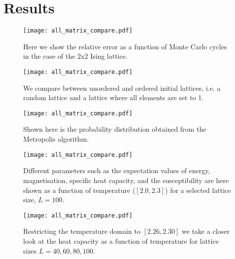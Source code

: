 \section{Results}
\label{sec:results}

\begin{figure}[htbp]
	\centering
	\texttt{[image: all\_matrix\_compare.pdf]}
	\caption{Here we show the relative error as a function of Monte Carlo cycles in the case of the 2x2 Ising lattice.}
	\label{fig:compare}
\end{figure}

\begin{figure}[htbp]
	\centering
	\texttt{[image: all\_matrix\_compare.pdf]}
	\caption{We compare between unordered and ordered initial lattices, i.e. a random lattice and a lattice where all elements are set to 1.}
	\label{fig:unordered_ordered}
\end{figure}

\begin{figure}[htbp]
	\centering
	\texttt{[image: all\_matrix\_compare.pdf]}
	\caption{Shown here is the probability distribution obtained from the Metropolis algorithm.}
	\label{fig:pde}
\end{figure}

\begin{figure}[htbp]
	\centering
	\texttt{[image: all\_matrix\_compare.pdf]}
	\caption{Different parameters such as the expectation values of energy, magnetisation, specific heat capacity, and the susceptibility are here shown as a function of temperature ($[2.0, 2.3]$) for a selected lattice size, $L=100$.}
	\label{fig:phase_transition}
\end{figure}

\begin{figure}[htbp]
	\centering
	\texttt{[image: all\_matrix\_compare.pdf]}
	\caption{Restricting the temperature domain to $[2.26, 2.30]$ we take a closer look at the heat capacity as a function of temperature for lattice sizes $L=40, 60, 80, 100$.}
	\label{fig:heatcap}
\end{figure}


